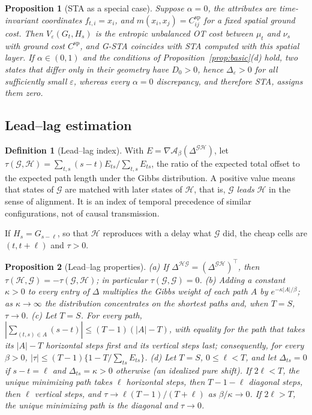 \documentclass[12pt]{article}
\newtheorem{proposition}{Proposition}
\theoremstyle{definition}
\newtheorem{definition}{Definition}
\begin{document}
\begin{proposition}[STA as a special case]\label{prop:sta}
Suppose $\alpha=0$, the attributes are time-invariant coordinates $f_{t,i}=x_i$, and $m(x_i,x_j)=C^{\mathrm{sp}}_{ij}$ for a fixed spatial ground cost. Then $V_\varepsilon(G_t,H_s)$ is the entropic unbalanced OT cost between $\mu_t$ and $\nu_s$ with ground cost $C^{\mathrm{sp}}$, and G-STA coincides with STA \citep{janati2020spatio} computed with this spatial layer. If $\alpha\in(0,1)$ and the conditions of Proposition~\ref{prop:basic}(d) hold, two states that differ only in their geometry have $D_0>0$, hence $\Delta_\varepsilon>0$ for all sufficiently small $\varepsilon$, whereas every $\alpha=0$ discrepancy, and therefore STA, assigns them zero.
\end{proposition}

\subsection{Lead--lag estimation}

\begin{definition}[Lead--lag index]\label{def:leadlag}
With $E=\nabla\mathcal A_\beta(\Delta^{\mathcal G\mathcal H})$, let $\tau(\mathcal G,\mathcal H)=\sum_{t,s}(s-t)E_{ts}/\sum_{t,s}E_{ts}$, the ratio of the expected total offset to the expected path length under the Gibbs distribution. A positive value means that states of $\mathcal G$ are matched with later states of $\mathcal H$, that is, $\mathcal G$ \emph{leads} $\mathcal H$ in the sense of alignment. It is an index of temporal precedence of similar configurations, not of causal transmission.
\end{definition}

If $H_s=G_{s-\ell}$, so that $\mathcal H$ reproduces with a delay what $\mathcal G$ did, the cheap cells are $(t,t+\ell)$ and $\tau>0$.

\begin{proposition}[Lead--lag properties]\label{prop:leadlag}
(a) If $\Delta^{\mathcal H\mathcal G}=(\Delta^{\mathcal G\mathcal H})^\top$, then $\tau(\mathcal H,\mathcal G)=-\tau(\mathcal G,\mathcal H)$; in particular $\tau(\mathcal G,\mathcal G)=0$. (b) Adding a constant $\kappa>0$ to every entry of $\Delta$ multiplies the Gibbs weight of each path $A$ by $e^{-\kappa|A|/\beta}$; as $\kappa\to\infty$ the distribution concentrates on the shortest paths and, when $T=S$, $\tau\to0$. (c) Let $T=S$. For every path, $|\sum_{(t,s)\in A}(s-t)|\le(T-1)(|A|-T)$, with equality for the path that takes its $|A|-T$ horizontal steps first and its vertical steps last; consequently, for every $\beta>0$, $|\tau|\le(T-1)\{1-T/\sum_{ts}E_{ts}\}$. (d) Let $T=S$, $0\le\ell<T$, and let $\Delta_{ts}=0$ if $s-t=\ell$ and $\Delta_{ts}=\kappa>0$ otherwise (an idealized pure shift). If $2\ell<T$, the unique minimizing path takes $\ell$ horizontal steps, then $T-1-\ell$ diagonal steps, then $\ell$ vertical steps, and $\tau\to\ell(T-1)/(T+\ell)$ as $\beta/\kappa\to0$. If $2\ell>T$, the unique minimizing path is the diagonal and $\tau\to0$.
\end{proposition}
\end{document}
